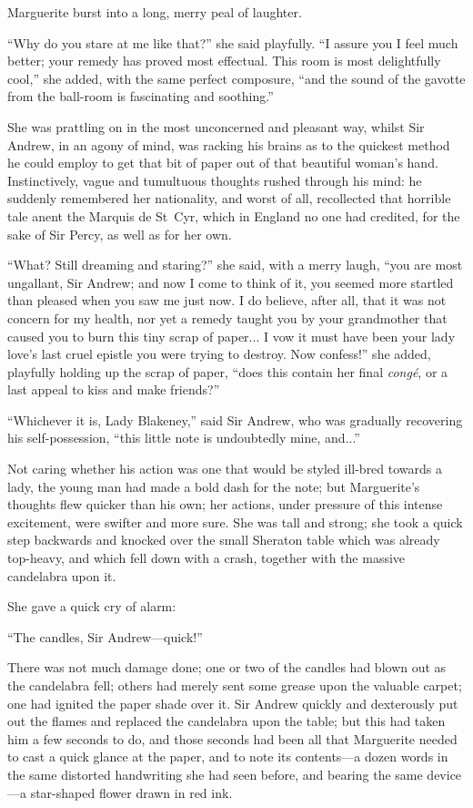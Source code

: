 Marguerite burst into a long, merry peal of laughter.

\enquote{Why do you stare at me like that?} she said playfully. \enquote{I assure you I feel much better; your remedy has proved most effectual. This room is most delightfully cool,} she added, with the same perfect composure, \enquote{and the sound of the gavotte from the ball-room is fascinating and soothing.}

She was prattling on in the most unconcerned and pleasant way, whilst Sir Andrew, in an agony of mind, was racking his brains as to the quickest method he could employ to get that bit of paper out of that beautiful woman's hand. Instinctively, vague and tumultuous thoughts  rushed through his mind: he suddenly remembered her nationality, and worst of all, recollected that horrible tale anent the Marquis de St~Cyr, which in England no one had credited, for the sake of Sir Percy, as well as for her own.

\enquote{What? Still dreaming and staring?} she said, with a merry laugh, \enquote{you are most ungallant, Sir Andrew; and now I come to think of it, you seemed more startled than pleased when you saw me just now. I do believe, after all, that it was not concern for my health, nor yet a remedy taught you by your grandmother that caused you to burn this tiny scrap of paper... I vow it must have been your lady love's last cruel epistle you were trying to destroy. Now confess!} she added, playfully holding up the scrap of paper, \enquote{does this contain her final \textit{congé}, or a last appeal to kiss and make friends?}

\enquote{Whichever it is, Lady Blakeney,} said Sir Andrew, who was gradually recovering his self-possession, \enquote{this little note is undoubtedly mine, and...}

Not caring whether his action was one that would be styled ill-bred towards a lady, the young man had made a bold dash for the note; but Marguerite's thoughts flew quicker than his own; her actions, under pressure of this intense excitement, were swifter and more sure. She was tall and strong; she took a quick step backwards and knocked over the small Sheraton table which was already top-heavy, and which fell down with a crash, together with the massive candelabra upon it.

She gave a quick cry of alarm:

\enquote{The candles, Sir Andrew---quick!}

There was not much damage done; one or two of the candles had blown out as the candelabra fell; others had merely sent some grease upon the valuable carpet; one had ignited the paper shade over it. Sir Andrew quickly and dexterously put out the flames and replaced the candelabra upon the table; but this had taken him a few seconds to do, and those seconds had been all that Marguerite needed to cast a quick glance at the paper, and to note its contents---a dozen words in the same distorted handwriting she had seen before, and bearing the same device---a star-shaped flower drawn in red ink.

